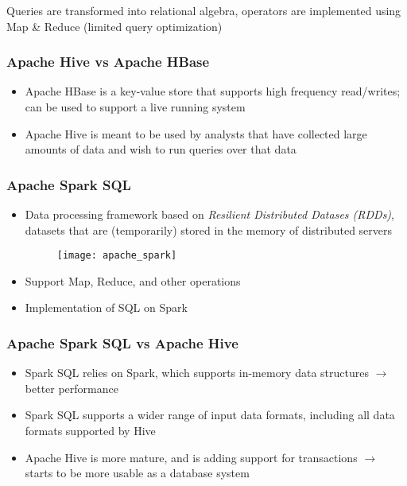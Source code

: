 Queries are transformed into relational algebra, operators are implemented using Map \& Reduce (limited query optimization)

\subsubsection{Apache Hive vs Apache HBase}

\begin{itemize}
    \item Apache HBase is a key-value store that supports high frequency read/writes; can be used to support a live running system
    \item Apache Hive is meant to be used by analysts that have collected large amounts of data and wish to run queries over that data
\end{itemize}

\newpage
\subsubsection{Apache Spark SQL}

\begin{itemize}
    \item Data processing framework based on \textit{Resilient Distributed Datases (RDDs)}, datasets that are (temporarily) stored in the memory of distributed servers
    \begin{figure}[H]
        \centering
        \texttt{[image: apache\_spark]}
    \end{figure}
    \item Support Map, Reduce, and other operations
    \item Implementation of SQL on Spark
\end{itemize}

\subsubsection{Apache Spark SQL vs Apache Hive}

\begin{itemize}
    \item Spark SQL relies on Spark, which supports in-memory data structures $\rightarrow$ better performance
    \item Spark SQL supports a wider range of input data formats, including all data formats supported by Hive
    \item Apache Hive is more mature, and is adding support for transactions $\rightarrow$ starts to be more usable as a database system
\end{itemize}

